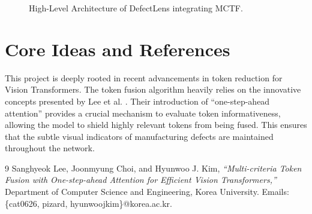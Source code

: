 \documentclass[12pt]{article}
\begin{document}
\begin{figure}[htpb]
    \centering
    \caption{High-Level Architecture of DefectLens integrating MCTF.}
    \label{fig:architecture}
\end{figure}

\section{Core Ideas and References}
This project is deeply rooted in recent advancements in token reduction for Vision Transformers. The token fusion algorithm heavily relies on the innovative concepts presented by Lee et al. \cite{lee2023multi}. Their introduction of ``one-step-ahead attention'' provides a crucial mechanism to evaluate token informativeness, allowing the model to shield highly relevant tokens from being fused. This ensures that the subtle visual indicators of manufacturing defects are maintained throughout the network.

\begin{thebibliography}{9}
Sanghyeok Lee, Joonmyung Choi, and Hyunwoo J. Kim,
\textit{``Multi-criteria Token Fusion with One-step-ahead Attention for Efficient Vision Transformers,''}
Department of Computer Science and Engineering, Korea University.
Emails: \{cat0626, pizard, hyunwoojkim\}@korea.ac.kr.
\end{thebibliography}
\end{document}
